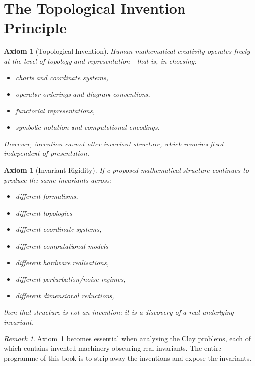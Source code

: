 \documentclass[12pt, openany]{book}
\newtheorem{axiom}[theorem]{Axiom}
\theoremstyle{remark}
\newtheorem{remark}[theorem]{Remark}
\begin{document}
\section{The Topological Invention Principle}
\label{sec:found-topology}

\begin{axiom}[Topological Invention]\label{ax:top-inv}
Human mathematical creativity operates freely at the level of topology and
representation---that is, in choosing:
\begin{itemize}
  \item charts and coordinate systems,
  \item operator orderings and diagram conventions,
  \item functorial representations,
  \item symbolic notation and computational encodings.
\end{itemize}
However, invention cannot alter invariant structure, which remains fixed independent
of presentation.
\end{axiom}

\begin{axiom}[Invariant Rigidity]\label{ax:inv-rigid}
If a proposed mathematical structure continues to produce the same invariants across:
\begin{itemize}
  \item different formalisms,
  \item different topologies,
  \item different coordinate systems,
  \item different computational models,
  \item different hardware realisations,
  \item different perturbation/noise regimes,
  \item different dimensional reductions,
\end{itemize}
then that structure is not an invention: it is a \emph{discovery} of a real underlying
invariant.
\end{axiom}

\begin{remark}
Axiom~\ref{ax:inv-rigid} becomes essential when analysing the Clay problems, each of
which contains invented machinery obscuring real invariants. The entire programme of
this book is to strip away the inventions and expose the invariants.
\end{remark}

\end{document}
